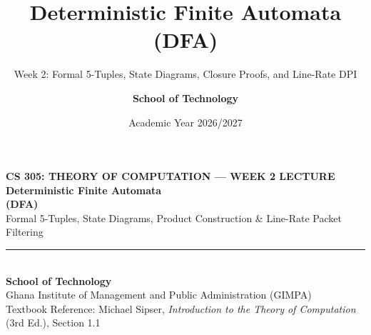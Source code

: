\documentclass[aspectratio=169, 10pt]{beamer}
\title{\textbf{\LARGE Deterministic Finite Automata (DFA)}}
\subtitle{\vspace{0.12cm}\large Week 2: Formal 5-Tuples, State Diagrams, Closure Proofs, and Line-Rate DPI}
\author{\textbf{School of Technology}}
\institute{Ghana Institute of Management and Public Administration (GIMPA)}
\date{Academic Year 2026/2027}
\begin{document}
\begin{frame}[plain]
  \vspace{0.4cm}
  \begin{center}
    {\scriptsize\bfseries\color{gimpaaccent}CS 305: THEORY OF COMPUTATION --- WEEK 2 LECTURE}\\[0.22cm]
    {\LARGE\bfseries\color{gimpanavy}Deterministic Finite Automata\\[0.08cm] (DFA)}\\[0.22cm]
    {\normalsize\color{gimpaslate}Formal 5-Tuples, State Diagrams, Product Construction \& Line-Rate Packet Filtering}\\[0.30cm]
    
    {\color{ruleGray}\rule{0.6\paperwidth}{0.6pt}}\\[0.30cm]
    
    {\small\bfseries\color{gimpanavy}School of Technology}\\[0.06cm]
    {\footnotesize\color{gimpaslate}Ghana Institute of Management and Public Administration (GIMPA)}\\[0.20cm]
    {\scriptsize\color{gimpaslate}Textbook Reference: Michael Sipser, \textit{Introduction to the Theory of Computation} (3rd Ed.), Section 1.1}
  \end{center}
\end{frame}
\end{document}

